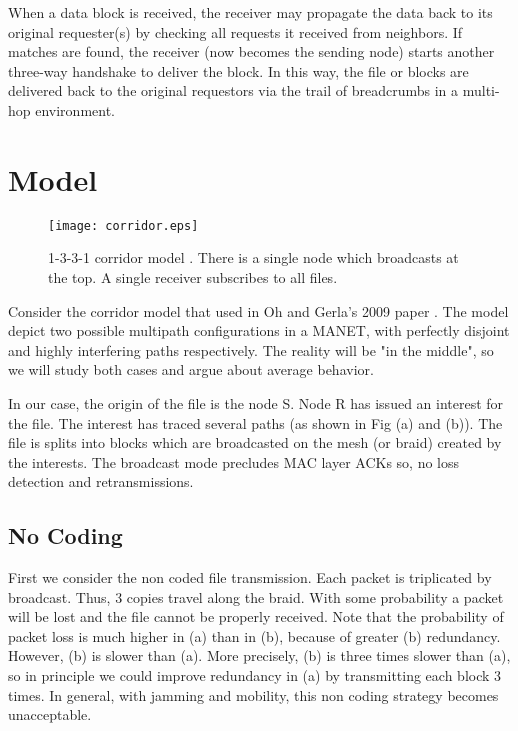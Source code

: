 When a data block is received, the receiver may propagate the data back to its original requester(s) by checking all requests it received from neighbors. If matches are found, the receiver (now becomes the sending node) starts another three-way handshake to deliver the block. In this way, the file or blocks are delivered back to the original requestors via the trail of breadcrumbs in a multi-hop environment. 

\section{Model}

\begin{figure}[t]
\centering
\texttt{[image: corridor.eps]}
\caption{1-3-3-1 corridor model \cite{Oh:2009:RMR:1702135.1702167}. There is a single node which broadcasts at the top. A single receiver subscribes to all files.}
\label{fig:static}
\end{figure}

	 	 	
Consider the corridor model that used in Oh and Gerla's 2009 paper \cite{Oh:2009:RMR:1702135.1702167}. The model depict two possible multipath configurations in a MANET, with perfectly disjoint and highly interfering paths respectively. The reality will be "in the middle", so we will study both cases and argue about average behavior.

	 	 	
In our case, the origin of the file is the node S. Node R has issued an interest for the file. The interest has traced several paths (as shown in Fig (a) and (b)). The file is splits into blocks which are broadcasted on the mesh (or braid) created by the interests. The broadcast mode precludes MAC layer ACKs so, no loss detection and retransmissions.

\subsection{No Coding}
	 	 	
First we consider the non coded file transmission. Each packet is triplicated by broadcast. Thus, 3 copies travel along the braid. With some probability a packet will be lost and the file cannot be properly received. Note that the probability of packet loss is much higher in (a) than in (b), because of greater (b) redundancy. However, (b) is slower than (a). More precisely, (b) is three times slower than (a), so in principle we could improve redundancy in (a) by transmitting each block 3 times. In general, with jamming and mobility, this non coding strategy becomes unacceptable.

